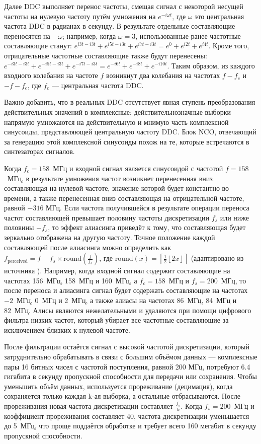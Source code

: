 \documentclass{report}
\begin{document}
Далее DDC выполняет перенос частоты, смещая сигнал с некоторой несущей частоты на нулевую частоту путём умножения на $e^{-i \omega t}$, где $\omega$ это центральная частота DDC в радианах в секунду. В результате отдельные составляющие переносятся на $-\omega$; например, когда $\omega=3$, использованные ранее частотные составляющие станут: $e^{i3t - i3t} + e^{i5t - i3t} + e^{i7t - i3t} = e^{0} + e^{i2t} + e^{i4t}$. Кроме того, отрицательные частотные составляющие также будут перенесены: $e^{-i3t - i3t} + e^{-i5t - i3t} + e^{-i7t - i3t} = e^{-i6t} + e^{-i8t} + e^{-i10t}$. Таким образом, из каждого входного колебания на частоте $f$ возникнут два колебания на частотах $f - f_c$ и $-f -f_c$, где $f_c$ --- центральная частота DDC.

Важно добавить, что в реальных DDC отсутствует явная ступень преобразования действительных значений в комплексные; действительнозначные выборки напрямую умножаются на действительную и мнимую часть комплексной синусоиды, представляющей центральную частоту DDC. Блок NCO, отвечающий за генерацию этой комплексной синусоиды похож на те, которые встречаются в синтезаторах сигналов.

Когда $f_c=158$~МГц и входной сигнал является синусоидой с частотой $f=158$~МГц, в результате умножения частот возникнет перенесенная вниз составляющая на нулевой частоте, значение которой будет константно во времени, а также перенесенная вниз составляющая на отрицательной частоте, равной $-316$ МГц. Если частота получившейся в результате операции переноса частот составляющей превышает половину частоты дискретизации $f_s$ или ниже половины $-f_s$, то эффект алиасинга приведёт к тому, что составляющая будет зеркально отображена на другую частоту. Точное положение каждой составляющей после алиасинга можно определить как $f_\text{perceived}=f - f_s \times \text{round}(\frac{f}{f_s})$, где $\text{round}(x)=\left\lceil \frac{1}{2} \left\lfloor 2x \right\rfloor \right\rceil$ (адаптировано из источника \cite{aliasing}). Например, когда входной сигнал содержит составляющие на частотах 156~МГц, 158~МГц и 160~МГц, а $f_c=158$~МГц и $f_s=200$~МГц, то после переноса и алиасинга сигнал будет содержать составляющие на частотах $-2$~МГц, 0~МГц и 2~МГц, а также алиасы на частотах 86~МГц, 84~МГц и 82~МГц. Алисы являются нежелательными и удаляются при помощи цифрового фильтра низких частот, который убирает все частотные составляющие за исключением близких к нулевой частоте.

После фильтрации остаётся сигнал с высокой частотой дискретизации, который затруднительно обрабатывать в связи с большим объёмом данных --- комплексные пары 16 битных чисел с частотой поступления, равной 200 МГц, потребуют 6.4 гигабита в секунду пропускной способности для передачи или сохранения. Чтобы уменьшить объём данных, используется прореживание (децимация), когда сохраняется только каждая k-ая выборка, а остальные отбрасываются. После прореживания новая частота дискретизации составляет $\frac{f_s}{k}$. Когда $f_s=200$~МГц и коэффициент прореживания составляет 40, частота дискретизации уменьшается до 5~МГц, что проще поддаётся обработке и требует всего 160 мегабит в секунду пропускной способности.
\end{document}
